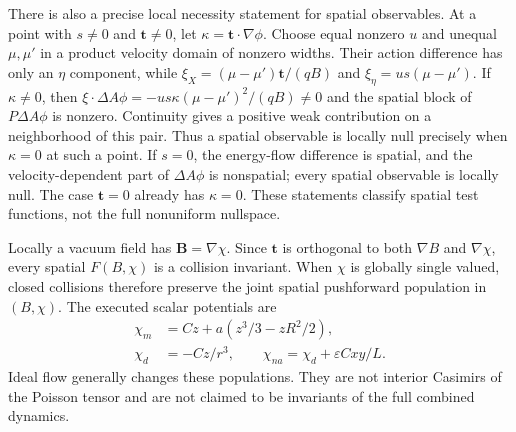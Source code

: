 \documentclass[11pt,letterpaper]{article}
\begin{document}
There is also a precise local necessity statement for spatial observables.
At a point with $s\ne0$ and $\mathbf t\ne0$, let
$\kappa=\mathbf t\cdot\nabla\phi$. Choose equal nonzero $u$ and unequal
$\mu,\mu'$ in a product velocity domain of nonzero widths. Their action
difference has only an $\eta$ component, while
$\xi_X=(\mu-\mu')\mathbf t/(qB)$ and
$\xi_\eta=u s(\mu-\mu')$. If $\kappa\ne0$, then
$\xi\cdot\Delta A\phi=-u s\kappa(\mu-\mu')^2/(qB)\ne0$ and the
spatial block of $P\Delta A\phi$ is nonzero. Continuity gives a positive
weak contribution on a neighborhood of this pair. Thus a spatial observable
is locally null precisely when $\kappa=0$ at such a point. If $s=0$, the
energy-flow difference is spatial, and the velocity-dependent part of
$\Delta A\phi$ is nonspatial; every spatial observable is locally null.
The case $\mathbf t=0$ already has $\kappa=0$. These statements classify
spatial test functions, not the full nonuniform nullspace.

Locally a vacuum field has $\mathbf B=\nabla\chi$. Since $\mathbf t$ is
orthogonal to both $\nabla B$ and $\nabla\chi$, every spatial $F(B,\chi)$
is a collision invariant. When $\chi$ is globally single valued, closed
collisions therefore preserve the joint spatial pushforward population
in $(B,\chi)$. The executed scalar potentials are
\begin{align}
 \chi_m&=Cz+a(z^3/3-zR^2/2),\\
 \chi_d&=-Cz/r^3,\qquad
 \chi_{na}=\chi_d+\varepsilon Cxy/L.
\end{align}
Ideal flow generally changes these populations. They are not interior
Casimirs of the Poisson tensor and are not claimed to be invariants of the
full combined dynamics.
\end{document}
